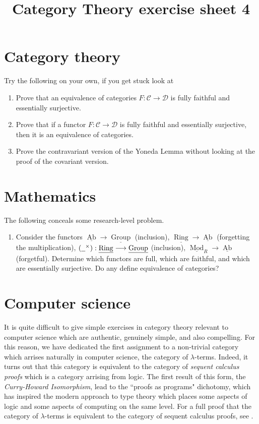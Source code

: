 \documentclass[12pt]{article}
\title{Category Theory exercise sheet 4}
\theoremstyle{plain}
\theoremstyle{definition}
\newcommand{\scr}[1]{\mathscr{#1}}
\newcommand{\und}[1]{\underline{\hspace{#1 cm}}}
\newcommand{\lto}{\longrightarrow}
\begin{document}
	
	\maketitle
	
	\section{Category theory}
	Try the following on your own, if you get stuck look at \cite[Page 31]{Reihl}
	\begin{enumerate}
		\item Prove that an equivalence of categories $F: \scr{C} \lto \scr{D}$ is fully faithful and essentially surjective.
		\item Prove that if a functor $F: \scr{C} \lto \scr{D}$ is fully faithful and essentially surjective, then it is an equivalence of categories.
		\item Prove the contravariant version of the Yoneda Lemma without looking at the proof of the covariant version.
		\end{enumerate}
	
	\section{Mathematics}
	The following conceals some research-level problem.
	\begin{enumerate}
		\item Consider the functors $\underline{\operatorname{Ab}} \lto \underline{\operatorname{Group}}$ (inclusion), $\underline{\operatorname{Ring}} \lto \underline{\operatorname{Ab}}$ (forgetting the multiplication), $(\und{0.2}^{\times}): \underline{\operatorname{Ring}} \lto \underline{\operatorname{Group}}$ (inclusion), $\underline{\operatorname{Mod}}_R \lto \underline{\operatorname{Ab}}$ (forgetful). Determine which functors are full, which are faithful, and which are essentially surjective. Do any define equivalence of categories?
		\end{enumerate}
	
	\section{Computer science}
	It is quite difficult to give simple exercises in category theory relevant to computer science which are authentic, genuinely simple, and also compelling. For this reason, we have dedicated the first assignment to a non-trivial category which arrises naturally in computer science, the category of $\lambda$-terms. Indeed, it turns out that this category is equivalent to the category of \emph{sequent calculus proofs} which is a category arrising from logic. The first result of this form, the \emph{Curry-Howard Isomorphism}, lead to the ``proofs as programs" dichotomy, which has inspired the modern approach to type theory which places some aspects of logic and some aspects of computing on the same level. For a full proof that the category of $\lambda$-terms is equivalent to the category of sequent calculus proofs, see \cite{GMZ}.
	
\end{document}
